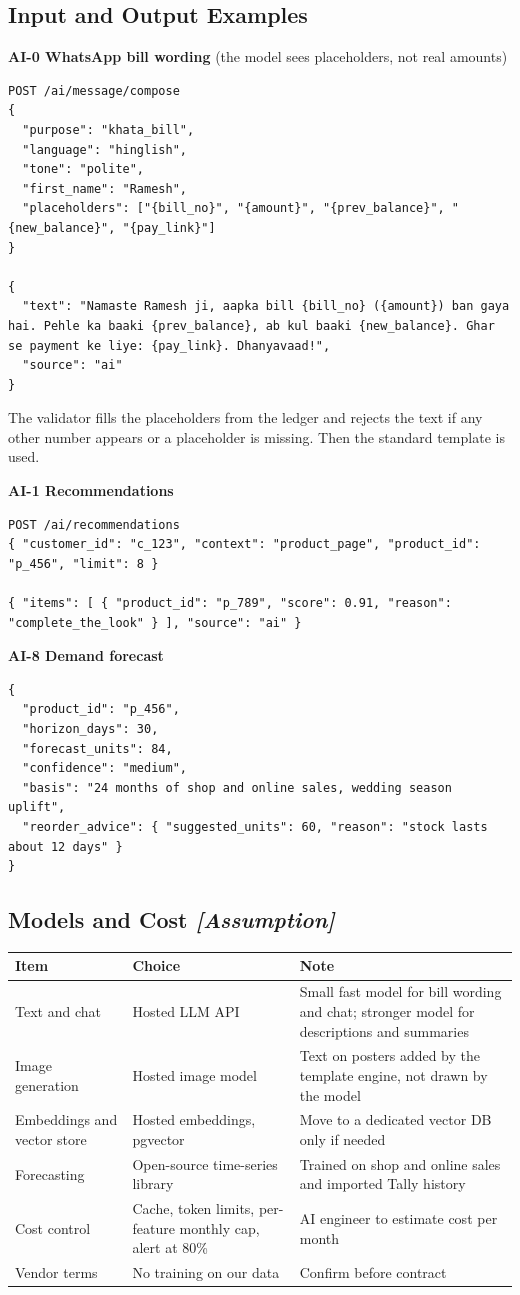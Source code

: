 \documentclass[11pt,a4paper]{article}
\newcommand{\assump}{\textit{[Assumption]}}
\newcommand{\hdr}{\rowcolor{hdrgray}\bfseries}
\begin{document}
\subsection{Input and Output Examples}
\textbf{AI-0 WhatsApp bill wording} (the model sees placeholders, not real amounts)
\begin{lstlisting}
POST /ai/message/compose
{
  "purpose": "khata_bill",
  "language": "hinglish",
  "tone": "polite",
  "first_name": "Ramesh",
  "placeholders": ["{bill_no}", "{amount}", "{prev_balance}", "{new_balance}", "{pay_link}"]
}

{
  "text": "Namaste Ramesh ji, aapka bill {bill_no} ({amount}) ban gaya hai. Pehle ka baaki {prev_balance}, ab kul baaki {new_balance}. Ghar se payment ke liye: {pay_link}. Dhanyavaad!",
  "source": "ai"
}
\end{lstlisting}
The validator fills the placeholders from the ledger and rejects the text if any other number appears or a placeholder is missing. Then the standard template is used.

\textbf{AI-1 Recommendations}
\begin{lstlisting}
POST /ai/recommendations
{ "customer_id": "c_123", "context": "product_page", "product_id": "p_456", "limit": 8 }

{ "items": [ { "product_id": "p_789", "score": 0.91, "reason": "complete_the_look" } ], "source": "ai" }
\end{lstlisting}

\textbf{AI-8 Demand forecast}
\begin{lstlisting}
{
  "product_id": "p_456",
  "horizon_days": 30,
  "forecast_units": 84,
  "confidence": "medium",
  "basis": "24 months of shop and online sales, wedding season uplift",
  "reorder_advice": { "suggested_units": 60, "reason": "stock lasts about 12 days" }
}
\end{lstlisting}

\subsection{Models and Cost \assump}
\begin{longtable}{L{3.6cm}L{5cm}L{7.9cm}}
\hdr Item & Choice & Note \\ \endhead
Text and chat & Hosted LLM API & Small fast model for bill wording and chat; stronger model for descriptions and summaries \\
Image generation & Hosted image model & Text on posters added by the template engine, not drawn by the model \\
Embeddings and vector store & Hosted embeddings, pgvector & Move to a dedicated vector DB only if needed \\
Forecasting & Open-source time-series library & Trained on shop and online sales and imported Tally history \\
Cost control & Cache, token limits, per-feature monthly cap, alert at 80\% & AI engineer to estimate cost per month \\
Vendor terms & No training on our data & Confirm before contract \\
\end{longtable}
\end{document}
